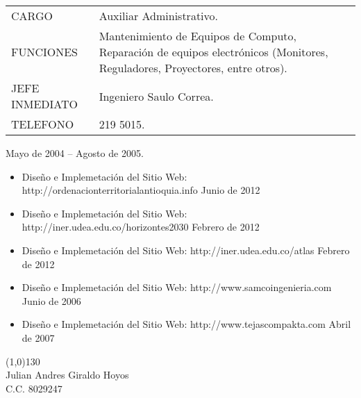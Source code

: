 \documentclass[a4paper, oneside, final, letter]{scrartcl}
\begin{document}
\begin{center}
\begin{tabularx}{0.97\linewidth}{p{6cm}X}
CARGO & Auxiliar Administrativo.\\
FUNCIONES & Mantenimiento de Equipos de Computo, Reparaci\'on de equipos electr\'onicos (Monitores, Reguladores, Proyectores, entre otros).\\
JEFE INMEDIATO & Ingeniero Saulo Correa.\\
TELEFONO & 219 5015.\\
\end{tabularx}
Mayo de 2004 – Agosto de 2005.\\
\begin{itemize}
\item Diseño e Implemetaci\'on del Sitio Web: http://ordenacionterritorialantioquia.info
Junio de 2012

\item Diseño e Implemetaci\'on del Sitio Web: http://iner.udea.edu.co/horizontes2030
Febrero de 2012

\item Diseño e Implemetaci\'on del Sitio Web: http://iner.udea.edu.co/atlas
Febrero de 2012

\item Diseño e Implemetaci\'on del Sitio Web: http://www.samcoingenieria.com
Junio de 2006

\item Diseño e Implemetaci\'on del Sitio Web: http://www.tejascompakta.com
Abril de 2007
\end{itemize}
\end{center}

\vspace{200pt}
\line(1,0){130}\\
\large Julian Andres Giraldo Hoyos\\
\large C.C. 8029247
\end{document}
